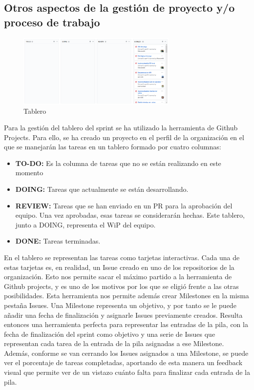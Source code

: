 \documentclass[11pt,a4paper]{report}
\begin{document}
\subsection{Otros aspectos de la gestión de proyecto y/o proceso de trabajo}
\begin{figure}[H]
	\centering
	\includegraphics[width=0.7\textwidth]{capturicas/tablerico.png}
	\caption{Tablero}
	\label{fig: tablero}
\end{figure}
Para la gestión del tablero del sprint se ha utilizado la herramienta de Github Projects. Para ello, se ha creado un proyecto en el perfil de la organización en el que se manejarán las tareas en un tablero formado por cuatro columnas:
\begin{itemize}
	\item \textbf{TO-DO:} Es la columna de tareas que no se están realizando en este momento
	\item \textbf{DOING:} Tareas que actualmente se están desarrollando.
	\item \textbf{REVIEW:} Tareas que se han enviado en un PR para la aprobación del equipo. Una vez aprobadas, esas tareas se considerarán hechas. Este tablero, junto a DOING, representa el WiP del equipo.
	\item \textbf{DONE:} Tareas terminadas.
\end{itemize}
En el tablero se representan las tareas como tarjetas interactivas. Cada una de estas tarjetas es, en realidad, un Issue creado en uno de los repositorios de la organización. Esto nos permite sacar el máximo partido a la herramienta de Github projects, y es uno de los motivos por los que se eligió frente a las otras posibilidades. Esta herramienta nos permite además crear Milestones en la misma pestaña Issues. Una Milestone representa un objetivo, y por tanto se le puede añadir una fecha de finalización y asignarle Issues previamente creados. Resulta entonces una herramienta perfecta para representar las entradas de la pila, con la fecha de finalización del sprint como objetivo y una serie de Issues que representan cada tarea de la entrada de la pila asignadas a ese Milestone. Además, conforme se van cerrando los Issues asignados a una Milestone, se puede ver el porcentaje de tareas completadas, aportando de esta manera un feedback visual que permite ver de un vistazo cuánto falta para finalizar cada entrada de la pila.
\end{document}
